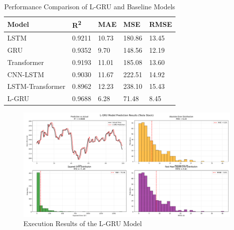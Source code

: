 \documentclass{cys}
\begin{document}
\begin{enumerate}
    \begin{table}[h!]
    \centering
    \caption{Performance Comparison of L-GRU and Baseline Models}
    \begin{tabular}{|l|l|l|l|l|}
    \hline
    \textbf{Model} & \textbf{R\textsuperscript{2}} & \textbf{MAE} & \textbf{MSE} & \textbf{RMSE} \\ \hline
    LSTM        & 0.9211 & 10.73 & 180.86 & 13.45 \\ \hline
    GRU         & 0.9352 & 9.70  & 148.56 & 12.19 \\ \hline
    Transformer & 0.9193 & 11.01 & 185.08 & 13.60 \\ \hline
    CNN-LSTM & 0.9030 & 11.67 & 222.51 & 14.92 \\ \hline
    LSTM-Transformer & 0.8962 & 12.23 & 238.10 & 15.43 \\ \hline
    L-GRU       & 0.9688 & 6.28  & 71.48  & 8.45  \\ \hline
    \end{tabular}
    \label{tab:performance_comparison}
    \end{table}

    \begin{figure}[h!]
        \centering
        \includegraphics[width=\textwidth]{Figure/Figure_1.png}
        \caption{Execution Results of the L‑GRU Model}
        \label{fig:execution}
    \end{figure}


\end{enumerate}
\end{document}
